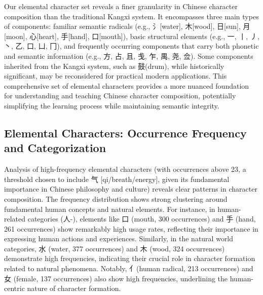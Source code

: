 \documentclass[11pt,letterpaper]{article}
\begin{document}
Our elemental character set reveals a finer granularity in Chinese
character composition than the traditional Kangxi system. It encompasses
three main types of components: familiar semantic radicals (e.g.,
氵{[}water{]}, 木{[}wood{]}, 日{[}sun{]}, 月{[}moon{]}, 心{[}heart{]},
手{[}hand{]}, 口{[}mouth{]}), basic structural elements (e.g., 一, 丨,
丿, 丶, 乙, 口, 凵, 冂), and frequently occurring components that carry
both phonetic and semantic information (e.g., 方, 占, 且, 戋, 乍, 禺,
尧, 佥). Some components inherited from the Kangxi system, such as
鼓(drum), while historically significant, may be reconsidered for
practical modern applications. This comprehensive set of elemental
characters provides a more nuanced foundation for understanding and
teaching Chinese character composition, potentially simplifying the
learning process while maintaining semantic integrity.

\subsection{Elemental Characters: Occurrence Frequency and
Categorization}\label{elemental-characters-occurrence-frequency-and-categorization}

Analysis of high-frequency elemental characters (with occurrences above
23, a threshold chosen to include 气 {[}qi/breath/energy{]}, given its
fundamental importance in Chinese philosophy and culture) reveals clear
patterns in character composition. The frequency distribution shows
strong clustering around fundamental human concepts and natural
elements. For instance, in human-related categories (人-), elements like
口 (mouth, 300 occurrences) and 手 (hand, 261 occurrences) show
remarkably high usage rates, reflecting their importance in expressing
human actions and experiences. Similarly, in the natural world
categories, 水 (water, 377 occurrences) and 木 (wood, 324 occurrences)
demonstrate high frequencies, indicating their crucial role in character
formation related to natural phenomena. Notably, 亻(human radical, 213
occurrences) and 女 (female, 137 occurrences) also show high
frequencies, underlining the human-centric nature of character
formation.
\end{document}
